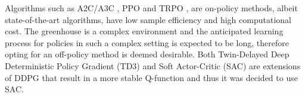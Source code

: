 Algorithms such as A2C/A3C \cite{mnihAsynchronousMethodsDeep2016}, PPO \cite{schulmanProximalPolicyOptimization2017} and TRPO \cite{schulmanTrustRegionPolicy2017}, are on-policy methods, albeit state-of-the-art algorithms, have low sample efficiency and high computational cost. The greenhouse is a complex environment and the anticipated  learning process for policies in such a complex setting is expected to be long, therefore opting for an off-policy method is deemed desirable. Both Twin-Delayed Deep Deterministic Policy Gradient (TD3) \cite{fujimotoAddressingFunctionApproximation2018} and Soft Actor-Critic (SAC) \cite{haarnojaSoftActorCriticOffPolicy2018} are extensions of DDPG that result in a more stable Q-function and thus it was decided to use SAC.
